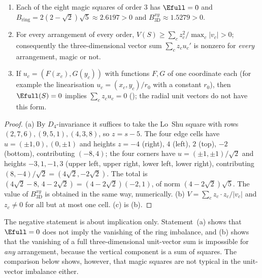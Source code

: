 \begin{proposition}
\label{prop:unit_negative}
\begin{enumerate}
\item[(a)] Each of the eight magic squares of order $3$ has $\Efull=0$ and
$B_{\mathrm{ring}}=2(2-\sqrt2)\sqrt5\approx2.6197>0$ and $B^{xy}_{3\mathrm D}\approx1.5279>0$.
\item[(b)] For every arrangement of every order, $V(S)\ge\sum_cz_c^2/\max_c|v_c|>0$; consequently the three-dimensional vector sum $\sum_cz_cu_c'$ is nonzero for \emph{every} arrangement, magic or not.
\item[(c)] If $u_c=(F(x_c),G(y_c))$ with functions $F,G$ of one coordinate each (for example the linearisation $u_c=(x_c,y_c)/r_0$ with a constant $r_0$), then $\Efull(S)=0$ implies $\sum_cz_cu_c=0$ (); the radial unit vectors do not have this form.
\end{enumerate}
\end{proposition}

\begin{proof}
(a) By $D_4$-invariance it suffices to take the Lo~Shu square with rows $(2,7,6),(9,5,1),(4,3,8)$, so $z=s-5$.
The four edge cells have $u=(\pm1,0),(0,\pm1)$ and heights $z=-4$ (right), $4$ (left), $2$ (top), $-2$ (bottom), contributing $(-8,4)$; the four corners have $u=(\pm1,\pm1)/\sqrt2$ and heights $-3,1,-1,3$ (upper left, upper right, lower left, lower right), contributing $(8,-4)/\sqrt2=(4\sqrt2,-2\sqrt2)$.
The total is $(4\sqrt2-8,\,4-2\sqrt2)=(4-2\sqrt2)(-2,1)$, of norm $(4-2\sqrt2)\sqrt5$.
The value of $B^{xy}_{3\mathrm D}$ is obtained in the same way, numerically.
(b) $V=\sum_cz_c\cdot z_c/|v_c|$ and $z_c\ne0$ for all but at most one cell.
(c) is (b).
\end{proof}

\begin{remark}
\label{rem:unit_reading}
The negative statement is about implication only.
Statement~(a) shows that $\Efull=0$ does not imply the vanishing of the ring imbalance, and (b) shows that the vanishing of a full three-dimensional unit-vector sum is impossible for \emph{any} arrangement, because the vertical component is a sum of squares.
The comparison below shows, however, that magic squares are not typical in the unit-vector imbalance either.
\end{remark}

